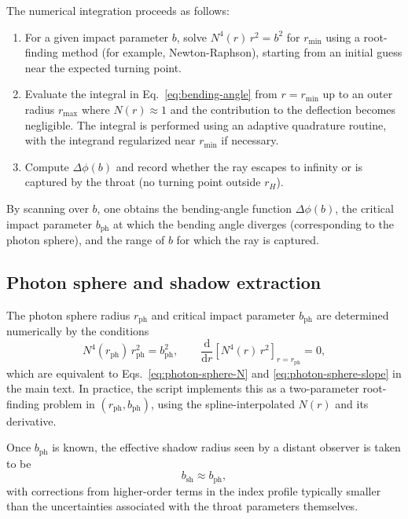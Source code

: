 \documentclass[11pt]{article}
\begin{document}
The numerical integration proceeds as follows:
\begin{enumerate}
  \item For a given impact parameter \(b\), solve
        \(N^4(r)\,r^2 = b^2\) for \(r_{\min}\) using a root-finding method
        (for example, Newton-Raphson), starting from an initial guess near
        the expected turning point.
  \item Evaluate the integral in Eq.~\eqref{eq:bending-angle} from
        \(r = r_{\min}\) up to an outer radius \(r_{\max}\) where
        \(N(r) \approx 1\) and the contribution to the deflection becomes
        negligible.  The integral is performed using an adaptive quadrature
        routine, with the integrand regularized near \(r_{\min}\) if
        necessary.
  \item Compute \(\Delta\phi(b)\) and record whether the ray escapes to
        infinity or is captured by the throat (no turning point outside
        \(r_H\)).
\end{enumerate}
By scanning over \(b\), one obtains the bending-angle function
\(\Delta\phi(b)\), the critical impact parameter \(b_{\text{ph}}\) at which
the bending angle diverges (corresponding to the photon sphere), and the
range of \(b\) for which the ray is captured.

\subsection{Photon sphere and shadow extraction}
\label{app:lensing-photon-shadow}

The photon sphere radius \(r_{\text{ph}}\) and critical impact parameter
\(b_{\text{ph}}\) are determined numerically by the conditions
\begin{equation}
  N^4(r_{\text{ph}})\,r_{\text{ph}}^2
  = b_{\text{ph}}^2,
  \qquad
  \frac{\mathrm{d}}{\mathrm{d}r}
  \left[ N^4(r)\,r^2 \right]_{r = r_{\text{ph}}}
  = 0,
\end{equation}
which are equivalent to Eqs.~\eqref{eq:photon-sphere-N} and
\eqref{eq:photon-sphere-slope} in the main text.  In practice, the script
implements this as a two-parameter root-finding problem in
\((r_{\text{ph}}, b_{\text{ph}})\), using the spline-interpolated
\(N(r)\) and its derivative.

Once \(b_{\text{ph}}\) is known, the effective shadow radius seen by a
distant observer is taken to be
\begin{equation}
  b_{\text{sh}} \approx b_{\text{ph}},
\end{equation}
with corrections from higher-order terms in the index profile typically
smaller than the uncertainties associated with the throat parameters
themselves.
\end{document}
